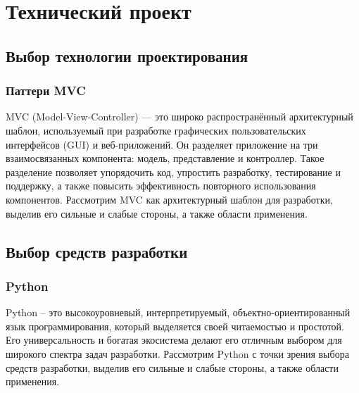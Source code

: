 \section{Технический проект}
\subsection{Выбор технологии проектирования}
\subsubsection{Паттери MVC}

MVC (Model-View-Controller) — это широко распространённый архитектурный шаблон, используемый при разработке графических пользовательских интерфейсов (GUI) и веб-приложений. Он разделяет приложение на три взаимосвязанных компонента: модель, представление и контроллер. Такое разделение позволяет упорядочить код, упростить разработку, тестирование и поддержку, а также повысить эффективность повторного использования компонентов. Рассмотрим MVC как архитектурный шаблон для разработки, выделив его сильные и слабые стороны, а также области применения.

\subsection{Выбор средств разработки}
\subsubsection{Python}

Python – это высокоуровневый, интерпретируемый, объектно-ориентированный язык программирования, который выделяется своей читаемостью и простотой. Его универсальность и богатая экосистема делают его отличным выбором для широкого спектра задач разработки. Рассмотрим Python с точки зрения выбора средств разработки, выделив его сильные и слабые стороны, а также области применения.

